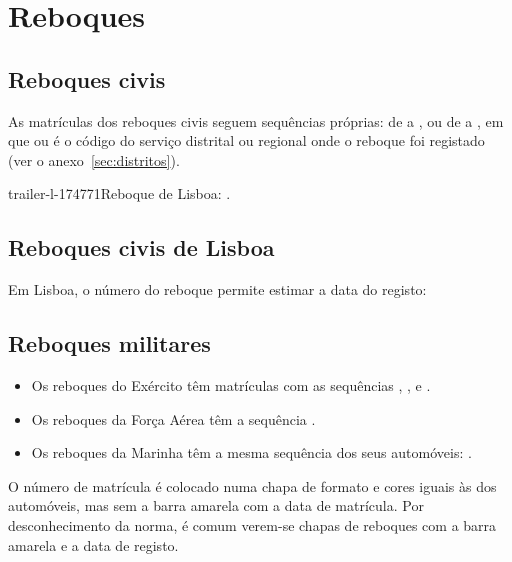 \section{Reboques}

\subsection{Reboques civis}

As matrículas dos reboques civis seguem sequências próprias: de  a
, ou de  a , em que  ou
 é o código do serviço distrital ou regional onde o reboque foi
registado (ver o anexo~\ref{sec:distritos}).

%
          {trailer-l-174771}{Reboque de Lisboa: .}

\subsection{Reboques civis de Lisboa}

Em Lisboa, o número do reboque permite estimar a data do registo:


\subsection{Reboques militares}

\begin{itemize}
  \item Os reboques do Exército têm matrículas com as sequências ,
        ,  e .
  \item Os reboques da Força Aérea têm a sequência .
  \item Os reboques da Marinha têm a mesma sequência dos seus automóveis:
        .
\end{itemize}

O número de matrícula é colocado numa chapa de formato e cores iguais às dos
automóveis, mas sem a barra amarela com a data de matrícula. Por desconhecimento
da norma, é comum verem-se chapas de reboques com a barra amarela e a data de
registo.

